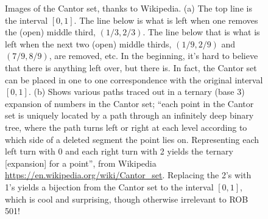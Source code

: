 \begin{figure}[htb]%
\centering
{}
\hspace{5pt}%
%
\caption[]{Images of the Cantor set, thanks to Wikipedia. (a) The top line is the interval $[0, 1]$. The line below is what is left when one removes the (open) middle third, $(1/3, 2/3)$. The line below that is what is left when the next two (open) middle thirds, $(1/9, 2/9)$ and $(7/9, 8/9)$, are removed, etc. In the beginning, it's hard to believe that there is anything left over, but there is. In fact, the Cantor set can be placed in one to one correspondence with the original interval $[0,1]$. (b) Shows various paths traced out in a ternary (base 3) expansion of numbers in the Cantor set; ``each point in the Cantor set is uniquely located by a path through an infinitely deep binary tree, where the path turns left or right at each level according to which side of a deleted segment the point lies on. Representing each left turn with 0 and each right turn with 2 yields the ternary  [expansion] for a point'', from Wikipedia \url{https://en.wikipedia.org/wiki/Cantor_set}. Replacing the 2's with 1's  yields a bijection from the Cantor set to the interval $[0, 1]$, which is cool and surprising, though otherwise irrelevant to ROB 501! 
} 
    \label{fig:CantorSet}
\end{figure}

